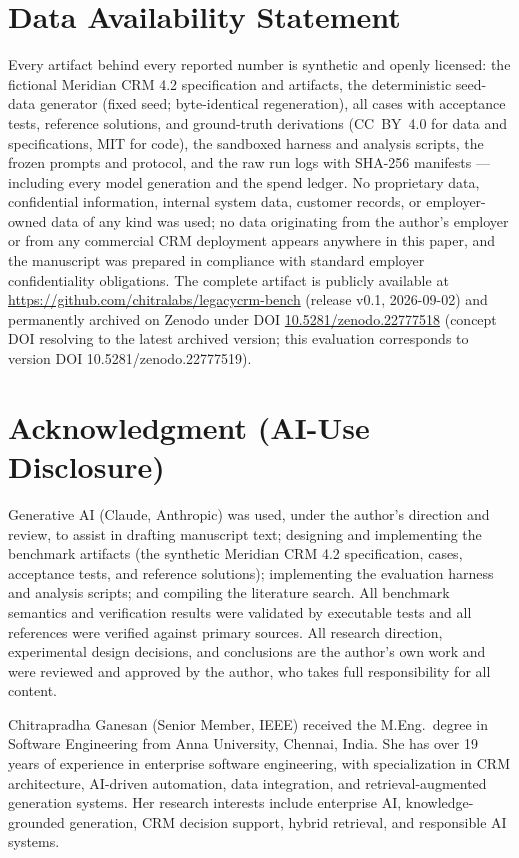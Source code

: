 \documentclass{ieeetj}
\begin{document}
\section*{Data Availability Statement}
Every artifact behind every reported number is synthetic and openly licensed: the fictional
Meridian CRM 4.2 specification and artifacts, the deterministic seed-data generator (fixed
seed; byte-identical regeneration), all \NumCases{} cases with acceptance tests, reference
solutions, and ground-truth derivations (CC~BY~4.0 for data and specifications, MIT for
code), the sandboxed harness and analysis scripts, the frozen prompts and protocol, and the
raw run logs with SHA-256 manifests --- including every model generation and the spend
ledger. No proprietary data, confidential information, internal system data, customer
records, or employer-owned data of any kind was used; no data originating from the author's
employer or from any commercial CRM deployment appears anywhere in this paper, and the
manuscript was prepared in compliance with standard employer confidentiality obligations.
The complete artifact is publicly available at \url{https://github.com/chitralabs/legacycrm-bench} (release v0.1, 2026-09-02) and
permanently archived on Zenodo under DOI \href{https://doi.org/10.5281/zenodo.22777518}{10.5281/zenodo.22777518}
(concept DOI resolving to the latest archived version; this evaluation corresponds to
version DOI 10.5281/zenodo.22777519).

\section*{Acknowledgment (AI-Use Disclosure)}
Generative AI (Claude, Anthropic) was used, under the author's direction and review, to
assist in drafting manuscript text; designing and implementing the benchmark artifacts (the
synthetic Meridian CRM 4.2 specification, cases, acceptance tests, and reference solutions);
implementing the evaluation harness and analysis scripts; and compiling the literature
search. All benchmark semantics and verification results were validated by executable tests
and all references were verified against primary sources. All research direction,
experimental design decisions, and conclusions are the author's own work and were reviewed
and approved by the author, who takes full responsibility for all content.




\begin{IEEEbiographynophoto}{Chitrapradha Ganesan}
(Senior Member, IEEE) received the M.Eng.\ degree in Software Engineering from Anna
University, Chennai, India. She has over 19 years of experience in enterprise software
engineering, with specialization in CRM architecture, AI-driven automation, data
integration, and retrieval-augmented generation systems. Her research interests include
enterprise AI, knowledge-grounded generation, CRM decision support, hybrid retrieval, and
responsible AI systems.
\end{IEEEbiographynophoto}
\end{document}
